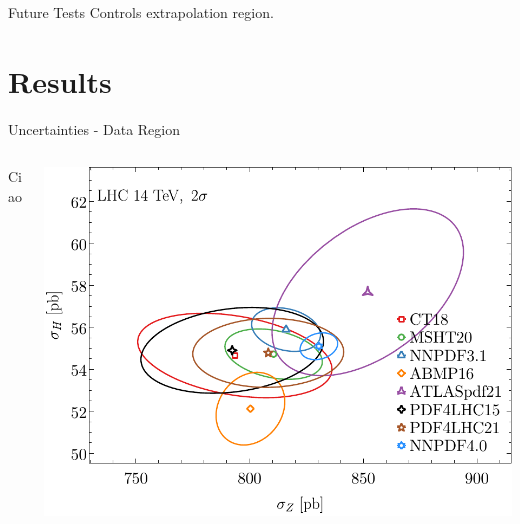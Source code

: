 \documentclass[9pt]{beamer}
\begin{document}
\begin{frame}{Future Tests}
    Controls extrapolation region.
\end{frame}

\section{Results}

\begin{frame}{Uncertainties - Data Region}
    \begin{columns}
        \begin{column}{0.5\textwidth}
            Ciao
        \end{column}
        \begin{column}{0.5\textwidth}
            \begin{tcolorbox}
                \includegraphics[width=\textwidth]{Corr_Z2H14TeV_2sigma}
            \end{tcolorbox}
        \end{column}
    \end{columns}
\end{frame}
\end{document}
